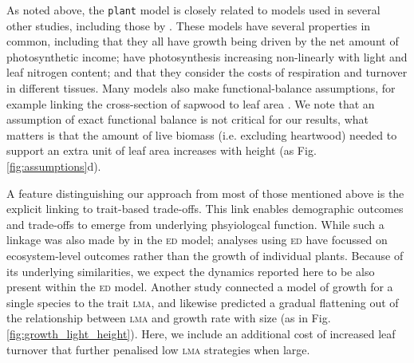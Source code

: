 \documentclass[9pt,twocolumn,twoside,lineno]{pnas-new}
\newcommand{\plant}{\texttt{plant}}
\newcommand{\lma}{\textsc{lma}}
\begin{document}
As noted above, the {\plant} model is closely related to models used in several other studies, including those by \citep{Givnish-1988, Yokozawa-1995, Makela-1997, King-1999, King-2005, Moorcroft-2001, Li-2014}. These models have several properties in common, including that they all have growth being driven by the net amount of photosynthetic income; have photosynthesis increasing non-linearly with light and leaf nitrogen content; and that they consider the costs of respiration and turnover in different tissues. Many models also make functional-balance assumptions, for example linking the cross-section of sapwood to leaf area \citep{Givnish-1988, Yokozawa-1995, Makela-1997, King-2005, Moorcroft-2001}. We note that an assumption of exact functional balance is not critical for our results, what matters is that the amount of live biomass (i.e. excluding heartwood) needed to support an extra unit of leaf area increases with height (as Fig. \ref{fig:assumptions}d).

A feature distinguishing our approach \citep[see also][]{Falster-2011, Falster-2016, Falster-2017} from most of those mentioned above is the explicit linking to trait-based trade-offs. This link enables demographic outcomes and trade-offs to emerge from underlying phsyiologcal function. While such a linkage was also made by \citep{Moorcroft-2001} in the \textsc{ed} model; analyses using \textsc{ed} have focussed on ecosystem-level outcomes rather than the growth of individual plants. Because of its underlying similarities, we expect the dynamics reported here to be also present within the \textsc{ed} model. Another study \citep{King-1999} connected a model of growth for a single species to the trait {\lma}, and likewise predicted a gradual flattening out of the relationship between {\lma} and growth rate with size (as in Fig. \ref{fig:growth_light_height}). Here, we include an additional cost of increased leaf turnover that further penalised low {\lma} strategies when large.
\end{document}
